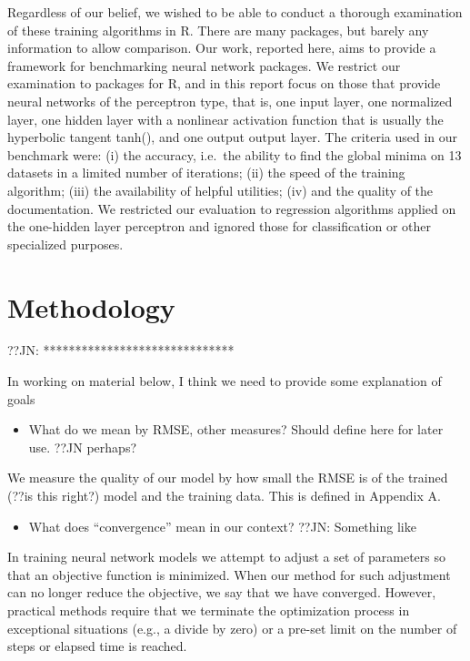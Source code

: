 Regardless of our belief, we wished to be able to conduct a thorough
examination of these training algorithms in R. There are many packages,
but barely any information to allow comparison. Our work, reported here,
aims to provide a framework for benchmarking neural network packages. We
restrict our examination to packages for R, and in this report focus on
those that provide neural networks of the perceptron type, that is, one
input layer, one normalized layer, one hidden layer with a nonlinear
activation function that is usually the hyperbolic tangent tanh(), and
one output output layer. The criteria used in our benchmark were: (i)
the accuracy, i.e.~the ability to find the global minima on 13 datasets
in a limited number of iterations; (ii) the speed of the training
algorithm; (iii) the availability of helpful utilities; (iv) and the
quality of the documentation. We restricted our evaluation to regression
algorithms applied on the one-hidden layer perceptron and ignored those
for classification or other specialized purposes.

\hypertarget{methodology}{%
\section{Methodology}\label{methodology}}

??JN: ******************************

In working on material below, I think we need to provide some
explanation of goals

\begin{itemize}
\tightlist
\item
  What do we mean by RMSE, other measures? Should define here for later
  use. ??JN perhaps?
\end{itemize}

We measure the quality of our model by how small the RMSE is of the
trained (??is this right?) model and the training data. This is defined
in Appendix A.

\begin{itemize}
\tightlist
\item
  What does ``convergence'' mean in our context? ??JN: Something like
\end{itemize}

In training neural network models we attempt to adjust a set of
parameters so that an objective function is minimized. When our method
for such adjustment can no longer reduce the objective, we say that we
have converged. However, practical methods require that we terminate the
optimization process in exceptional situations (e.g., a divide by zero)
or a pre-set limit on the number of steps or elapsed time is reached.


